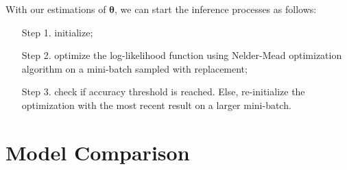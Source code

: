 \documentclass[11pt]{article}
\theoremstyle{definition}
\begin{document}
With our estimations of $\bm{\theta}$, we can start the inference processes as follows:
\begin{enumerate}
\item[Step 1.]  initialize;
\item[Step 2.]  optimize the log-likelihood function using  Nelder-Mead optimization algorithm on a mini-batch sampled with replacement;
\item[Step 3.] check if  accuracy threshold is reached. Else, re-initialize the optimization with the most recent result on a larger mini-batch.
\end{enumerate}

\section{Model Comparison} \label{Section_5}
\end{document}
